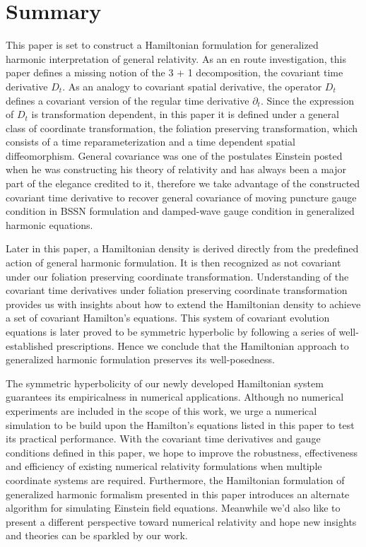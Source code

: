 \chapter{Summary}\label{summary}
This paper is set to construct a Hamiltonian formulation for generalized harmonic interpretation of general relativity. As an en route investigation, this paper defines a missing notion of the 3 + 1 decomposition, the covariant time derivative $D_{t}$. As an analogy to covariant spatial derivative, the operator $D_{t}$ defines a covariant version of the regular time derivative $\partial_{t}$. Since the expression of $D_{t}$ is transformation dependent, in this paper it is defined under a general class of coordinate transformation, the foliation preserving transformation, which consists of a time reparameterization and a time dependent spatial diffeomorphism. General covariance was one of the postulates Einstein posted when he was constructing his theory of relativity and has always been a major part of the elegance credited to it, therefore we take advantage of the constructed covariant time derivative to recover general covariance of moving puncture gauge condition in BSSN formulation and damped-wave gauge condition in generalized harmonic equations. 

Later in this paper, a Hamiltonian density is derived directly from the predefined action of general harmonic formulation. It is then recognized as not covariant under our foliation preserving coordinate transformation. Understanding of the covariant time derivatives under foliation preserving coordinate transformation provides us with insights about how to extend the Hamiltonian density to achieve a set of covariant Hamilton's equations. This system of covariant evolution equations is later proved to be symmetric hyperbolic by following a series of well-established prescriptions. Hence we conclude that the Hamiltonian approach to generalized harmonic formulation preserves its well-posedness. 

The symmetric hyperbolicity of our newly developed Hamiltonian system guarantees its empiricalness in numerical applications. Although no numerical experiments are included in the scope of this work, we urge a numerical simulation to be build upon the Hamilton's equations listed in this paper to test its practical performance. With the covariant time derivatives and gauge conditions defined in this paper, we hope to improve the robustness, effectiveness and efficiency of existing numerical relativity formulations when multiple coordinate systems are required. Furthermore, the Hamiltonian formulation of generalized harmonic formalism presented in this paper introduces an alternate algorithm for simulating Einstein field equations. Meanwhile we'd also like to present a different perspective toward numerical relativity and hope new insights and theories can be sparkled by our work. 